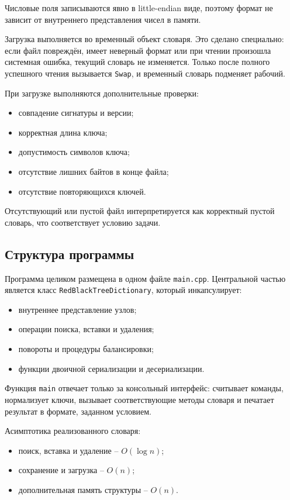 Числовые поля записываются явно в little-endian виде, поэтому формат не зависит от внутреннего представления чисел в памяти.

Загрузка выполняется во временный объект словаря. Это сделано специально: если файл повреждён, имеет неверный формат или при чтении произошла системная ошибка, текущий словарь не изменяется. Только после полного успешного чтения вызывается \texttt{Swap}, и временный словарь подменяет рабочий.

При загрузке выполняются дополнительные проверки:
\begin{itemize}
\item совпадение сигнатуры и версии;
\item корректная длина ключа;
\item допустимость символов ключа;
\item отсутствие лишних байтов в конце файла;
\item отсутствие повторяющихся ключей.
\end{itemize}

Отсутствующий или пустой файл интерпретируется как корректный пустой словарь, что соответствует условию задачи.

\subsection{Структура программы}

Программа целиком размещена в одном файле \texttt{main.cpp}. Центральной частью является класс \texttt{RedBlackTreeDictionary}, который инкапсулирует:
\begin{itemize}
\item внутреннее представление узлов;
\item операции поиска, вставки и удаления;
\item повороты и процедуры балансировки;
\item функции двоичной сериализации и десериализации.
\end{itemize}

Функция \texttt{main} отвечает только за консольный интерфейс: считывает команды, нормализует ключи, вызывает соответствующие методы словаря и печатает результат в формате, заданном условием.

Асимптотика реализованного словаря:
\begin{itemize}
\item поиск, вставка и удаление -- $O(\log n)$;
\item сохранение и загрузка -- $O(n)$;
\item дополнительная память структуры -- $O(n)$.
\end{itemize}

